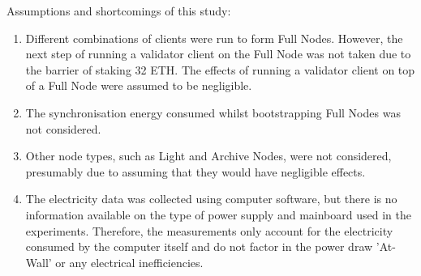 Assumptions and shortcomings of this study:
\begin{enumerate}
    \item Different combinations of clients were run to form Full Nodes. However, the next step of running a validator client on the Full Node was not taken due to the barrier of staking 32 ETH. The effects of running a validator client on top of a Full Node were assumed to be negligible.
    
    \item The synchronisation energy consumed whilst bootstrapping Full Nodes was not considered.
    
    \item Other node types, such as Light and Archive Nodes, were not considered, presumably due to assuming that they would have negligible effects.

    \item The electricity data was collected using computer software, but there is no information available on the type of power supply and mainboard used in the experiments. Therefore, the measurements only account for the electricity consumed by the computer itself and do not factor in the power draw 'At-Wall' or any electrical inefficiencies. \cite{Warkozek2012ACenters}
\end{enumerate}
 







